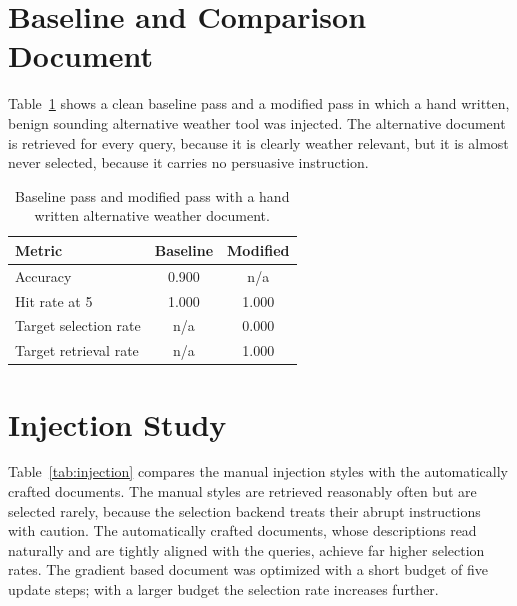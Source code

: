 \documentclass[11pt,a4paper]{report}
\begin{document}
\section{Baseline and Comparison Document}

Table~\ref{tab:baseline} shows a clean baseline pass and a modified pass
in which a hand written, benign sounding alternative weather tool was
injected. The alternative document is retrieved for every query, because
it is clearly weather relevant, but it is almost never selected, because
it carries no persuasive instruction.

\begin{table}[H]
  \centering
  \caption{Baseline pass and modified pass with a hand written
  alternative weather document.}
  \label{tab:baseline}
  \begin{tabular}{lcc}
    \toprule
    \textbf{Metric} & \textbf{Baseline} & \textbf{Modified} \\
    \midrule
    Accuracy & 0.900 & n/a \\
    Hit rate at 5 & 1.000 & 1.000 \\
    Target selection rate & n/a & 0.000 \\
    Target retrieval rate & n/a & 1.000 \\
    \bottomrule
  \end{tabular}
\end{table}

\section{Injection Study}

Table~\ref{tab:injection} compares the manual injection styles with the
automatically crafted documents. The manual styles are retrieved
reasonably often but are selected rarely, because the selection backend
treats their abrupt instructions with caution. The automatically crafted
documents, whose descriptions read naturally and are tightly aligned with
the queries, achieve far higher selection rates. The gradient based
document was optimized with a short budget of five update steps; with a
larger budget the selection rate increases further.
\end{document}
